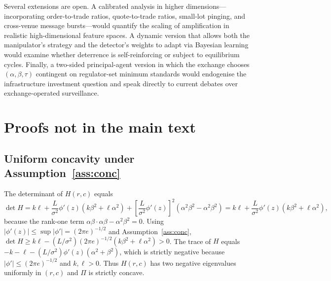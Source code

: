\documentclass[11pt,a4paper]{article}
\theoremstyle{definition}
\theoremstyle{remark}
\newcommand{\1}{\mathbf{1}}
\begin{document}
Several extensions are open. A calibrated analysis in higher dimensions---incorporating order-to-trade ratios, quote-to-trade ratios, small-lot pinging, and cross-venue message bursts---would quantify the scaling of amplification in realistic high-dimensional feature spaces. A dynamic version that allows both the manipulator's strategy and the detector's weights to adapt via Bayesian learning would examine whether deterrence is self-reinforcing or subject to equilibrium cycles. Finally, a two-sided principal-agent version in which the exchange chooses $(\alpha,\beta,\tau)$ contingent on regulator-set minimum standards would endogenise the infrastructure investment question and speak directly to current debates over exchange-operated surveillance.




\appendix
\section{Proofs not in the main text}
\label{app:proofs}

\subsection{Uniform concavity under Assumption~\ref{ass:conc}}
The determinant of $H(r,c)$ equals
\[
\det H = k\ell + \frac{L}{\sigma^2}\phi'(z)(k\beta^2 + \ell\alpha^2) + \left[\frac{L}{\sigma^2}\phi'(z)\right]^2(\alpha^2\beta^2 - \alpha^2\beta^2) = k\ell + \frac{L}{\sigma^2}\phi'(z)(k\beta^2+\ell\alpha^2),
\]
because the rank-one term $\alpha\beta\cdot\alpha\beta - \alpha^2\beta^2=0$. Using $|\phi'(z)|\le\sup|\phi'|=(2\pi e)^{-1/2}$ and Assumption~\ref{ass:conc},
$\det H\ge k\ell - (L/\sigma^2)(2\pi e)^{-1/2}(k\beta^2+\ell\alpha^2)>0$. The trace of $H$ equals $-k-\ell - (L/\sigma^2)\phi'(z)(\alpha^2+\beta^2)$, which is strictly negative because $|\phi'|\le(2\pi e)^{-1/2}$ and $k,\ell>0$. Thus $H(r,c)$ has two negative eigenvalues uniformly in $(r,c)$ and $\Pi$ is strictly concave.
\end{document}
